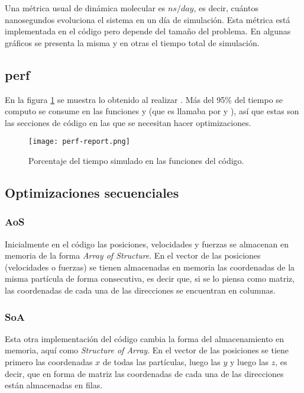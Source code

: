 \documentclass[a4paper,spanish,12pt,twoside]{article}
\begin{document}
Una métrica usual de dinámica molecular es $ns/day$, es decir, cuántos nanosegundos evoluciona el sistema en un día de simulación. Esta métrica está implementada en el código pero depende del tamaño del problema. En algunas gráficos se presenta la misma y en otras el tiempo total de simulación.

\subsection*{perf}

En la figura \ref{fig:perf-report} se muestra lo obtenido al realizar . Más del 95\% del tiempo se computo se consume en las funciones  y  (que es llamaba por  y ), así que estas son las secciones de código en las que se necesitan hacer optimizaciones.
\begin{figure}[h]
	\centering
	\texttt{[image: perf-report.png]}
	\caption{Porcentaje del tiempo simulado en las funciones del código.}
	\label{fig:perf-report}
\end{figure}

\subsection{Optimizaciones secuenciales}

\subsubsection*{AoS}

Inicialmente en el código las posiciones, velocidades y fuerzas se almacenan en memoria de la forma \textit{Array of Structure}. En el vector de las posiciones (velocidades o fuerzas) se tienen almacenadas en memoria las coordenadas de la misma partícula de forma consecutiva, es decir que, si se lo piensa como matriz, las coordenadas de cada una de las direcciones se encuentran en columnas.

\subsubsection*{SoA}

Esta otra implementación del código cambia la forma del almacenamiento en memoria, aquí como \textit{Structure of Array}. En el vector de las posiciones se tiene primero las coordenadas $x$ de todas las partículas, luego las $y$ y luego las $z$, es decir, que en forma de matriz las coordenadas de cada una de las direcciones están almacenadas en filas.
\end{document}
